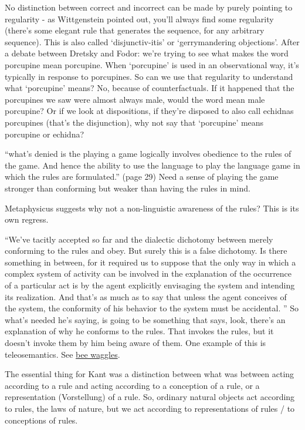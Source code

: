 No distinction between correct and incorrect can be made by purely pointing to regularity - as Wittgenstein pointed out, you'll always find some regularity (there's some elegant rule that generates the sequence, for any arbitrary sequence). This is also called `disjunctiv-itis' or `gerrymandering objections'. After a debate between Dretsky and Fodor: we're trying to see what makes the word porcupine mean porcupine. When `porcupine' is used in an observational way, it's typically in response to porcupines. So can we use that regularity to understand what `porcupine' means? No, because of counterfactuals. If it happened that the porcupines we saw were almost always male, would the word mean male porcupine? Or if we look at dispositions, if they're disposed to also call echidnas porcupines (that's the disjunction), why not say that `porcupine' means porcupine or echidna?

``what's denied is the playing a game logically involves obedience to the rules of the game. And hence the ability to use the language to play the language game in which the rules are formulated.'' (page 29) Need a sense of playing the game stronger than conforming but weaker than having the rules in mind.

Metaphysicus suggests why not a non-linguistic awareness of the rules? This is its own regress.

``We've tacitly accepted so far and the dialectic dichotomy between merely conforming to the rules and obey. But surely this is a false dichotomy. Is there something in between, for it required us to suppose that the only way in which a complex system of activity can be involved in the explanation of the occurrence of a particular act is by the agent explicitly envisaging the system and intending its realization. And that's as much as to say that unless the agent conceives of the system, the conformity of his behavior to the system must be accidental. '' So what's needed he's saying, is going to be something that says, look, there's an explanation of why he conforms to the rules. That invokes the rules, but it doesn't invoke them by him being aware of them. One example of this is teleosemantics. See \href{doc/2 phil/Phil Situations/Bee Waggle.tex}{bee waggles}.

The essential thing for Kant was a distinction between what was between acting according to a rule and acting according to a conception of a rule, or a representation (Vorstellung) of a rule. So, ordinary natural objects act according to rules, the laws of nature, but we act according to representations of rules / to conceptions of rules.

